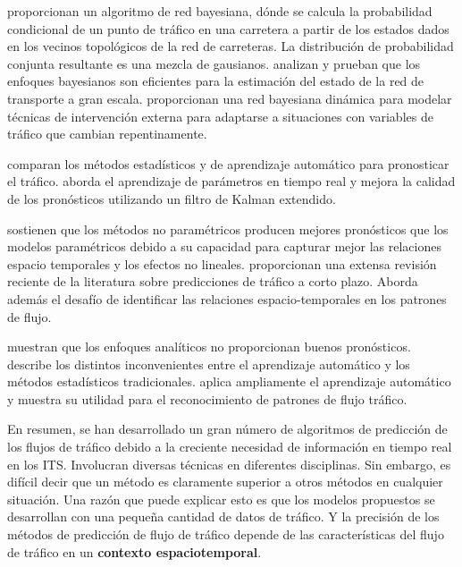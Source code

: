 \documentclass[]{book}
\begin{document}
\citep{sun2006bayesian} proporcionan un algoritmo de red bayesiana,
dónde se calcula la probabilidad condicional de un punto de tráfico en
una carretera a partir de los estados dados en los vecinos topológicos
de la red de carreteras. La distribución de probabilidad conjunta
resultante es una mezcla de gausianos. \citep{tebaldi1998bayesian}
analizan y prueban que los enfoques bayesianos son eficientes para la
estimación del estado de la red de transporte a gran escala.
\citep{anacleto2013multivariate} proporcionan una red bayesiana dinámica
para modelar técnicas de intervención externa para adaptarse a
situaciones con variables de tráfico que cambian repentinamente.

\citep{smith1997traffic} comparan los métodos estadísticos y de
aprendizaje automático para pronosticar el tráfico.
\citep{van2008online} aborda el aprendizaje de parámetros en tiempo real
y mejora la calidad de los pronósticos utilizando un filtro de Kalman
extendido.

\citep{oswald2000traffic} sostienen que los métodos no paramétricos
producen mejores pronósticos que los modelos paramétricos debido a su
capacidad para capturar mejor las relaciones espacio temporales y los
efectos no lineales. \citep{vlahogianni2014short} proporcionan una
extensa revisión reciente de la literatura sobre predicciones de tráfico
a corto plazo. Aborda además el desafío de identificar las relaciones
espacio-temporales en los patrones de flujo.

\citep{qiao2001intelligent} muestran que los enfoques analíticos no
proporcionan buenos pronósticos. \citep{breiman2003statistical} describe
los distintos inconvenientes entre el aprendizaje automático y los
métodos estadísticos tradicionales. \citep{ripley2007pattern} aplica
ampliamente el aprendizaje automático y muestra su utilidad para el
reconocimiento de patrones de flujo tráfico.

En resumen, se han desarrollado un gran número de algoritmos de
predicción de los flujos de tráfico debido a la creciente necesidad de
información en tiempo real en los ITS. Involucran diversas técnicas en
diferentes disciplinas. Sin embargo, es difícil decir que un método es
claramente superior a otros métodos en cualquier situación. Una razón
que puede explicar esto es que los modelos propuestos se desarrollan con
una pequeña cantidad de datos de tráfico. Y la precisión de los métodos
de predicción de flujo de tráfico depende de las características del
flujo de tráfico en un \textbf{contexto espaciotemporal}.
\end{document}
